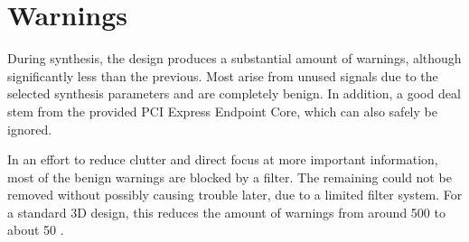 \section{Warnings}

During synthesis, the design produces a substantial amount of warnings, although significantly less than the previous.
Most arise from unused signals due to the selected synthesis parameters and are completely benign.
In addition, a good deal stem from the provided PCI Express Endpoint Core, which can also safely be ignored.

In an effort to reduce clutter and direct focus at more important information, most of the benign warnings are blocked by a filter.
The remaining could not be removed without possibly causing trouble later, due to a limited filter system.
For a standard 3D design, this reduces the amount of warnings from around 500 to about 50 \footnotemark.

